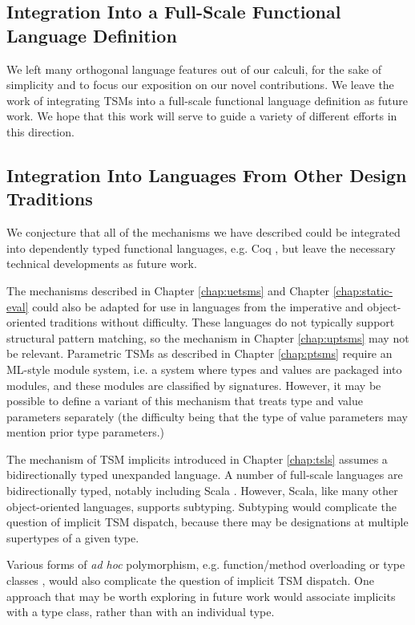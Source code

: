\vspace{-4px}
\subsection{Integration Into a Full-Scale Functional Language Definition}
We left many orthogonal language features out of our calculi, for the sake of simplicity and to focus our exposition on our novel contributions. We leave the work of integrating TSMs into a full-scale functional language definition as future work. We hope that this work will serve to guide a variety of different efforts in this direction.

\vspace{-4px}
\subsection{Integration Into Languages From Other Design Traditions}
\label{sec:integration}
We conjecture that all of the mechanisms we have described could be integrated into dependently typed functional languages, e.g. Coq \cite{Coq:manual}, but leave the necessary technical developments as future work.

The mechanisms described in Chapter \ref{chap:uetsms} and Chapter \ref{chap:static-eval} could also be adapted for use in languages from the imperative and object-oriented traditions without difficulty. These languages do not typically support structural pattern matching, so the mechanism in Chapter \ref{chap:uptsms} may not be relevant. Parametric TSMs as described in Chapter \ref{chap:ptsms} require an ML-style module system, i.e. a system where types and values are packaged into modules, and these modules are classified by signatures. However, it may be possible to define a variant of this mechanism that treats type and value parameters separately (the difficulty being that the type of value parameters may mention prior type parameters.)

The mechanism of TSM implicits introduced in Chapter \ref{chap:tsls} assumes a bidirectionally typed unexpanded language. A number of full-scale languages are bidirectionally typed, notably including Scala \cite{odersky2008programming}. However, Scala, like many other object-oriented languages, supports subtyping. Subtyping would complicate the question of implicit TSM dispatch, because there may be designations at multiple supertypes of a given type.

Various forms of \emph{ad hoc} polymorphism, e.g. function/method overloading or type classes \cite{Hall:1996:TCH:227699.227700}, would also complicate the question of implicit TSM dispatch. One approach that may be worth exploring in future work would associate implicits with a type class, rather than with an individual type.

